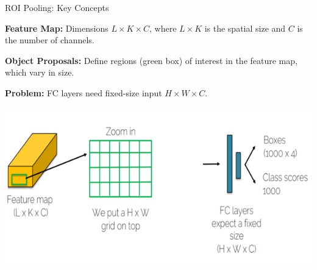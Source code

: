 \documentclass{beamer}
\begin{document}
\begin{frame}{ROI Pooling: Key Concepts}

    \textbf{Feature Map:} 
    Dimensions \( L \times K \times C \), where \( L \times K \) is the spatial size and \( C \) is the number of channels.

    \textbf{Object Proposals:} 
    Define regions (green box) of interest in the feature map, which vary in size.
    
    \textbf{Problem:} 
    FC layers need fixed-size input \( H \times W \times C \).

    \vspace{0.4cm}
    \centering
    \includegraphics[width=0.8\linewidth]{slide10.png}

\end{frame}
\end{document}
